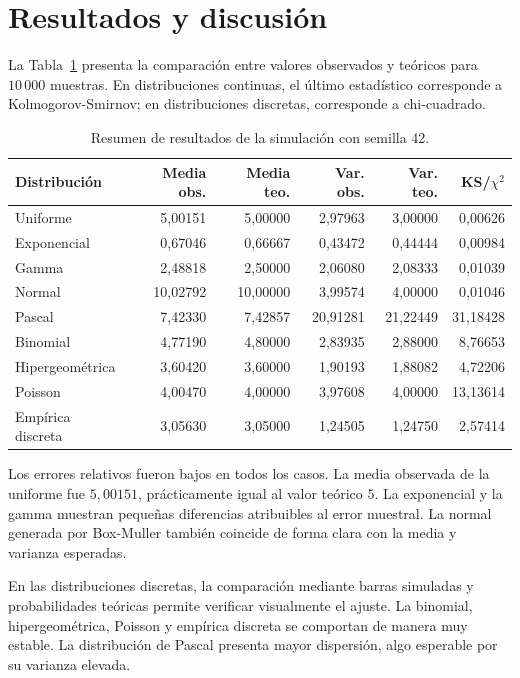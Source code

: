 \documentclass{article}
\begin{document}
\section{Resultados y discusión}

La Tabla~\ref{tab:resultados} presenta la comparación entre valores observados
y teóricos para $10\,000$ muestras. En distribuciones continuas, el último
estadístico corresponde a Kolmogorov-Smirnov; en distribuciones discretas,
corresponde a chi-cuadrado.

\begin{table}[H]
\centering
\caption{Resumen de resultados de la simulación con semilla 42.}
\label{tab:resultados}
\begin{tabular}{lrrrrr}
\toprule
\textbf{Distribución} & \textbf{Media obs.} & \textbf{Media teo.} &
\textbf{Var. obs.} & \textbf{Var. teo.} & \textbf{KS/$\chi^2$} \\
\midrule
Uniforme & 5{,}00151 & 5{,}00000 & 2{,}97963 & 3{,}00000 & 0{,}00626 \\
Exponencial & 0{,}67046 & 0{,}66667 & 0{,}43472 & 0{,}44444 & 0{,}00984 \\
Gamma & 2{,}48818 & 2{,}50000 & 2{,}06080 & 2{,}08333 & 0{,}01039 \\
Normal & 10{,}02792 & 10{,}00000 & 3{,}99574 & 4{,}00000 & 0{,}01046 \\
Pascal & 7{,}42330 & 7{,}42857 & 20{,}91281 & 21{,}22449 & 31{,}18428 \\
Binomial & 4{,}77190 & 4{,}80000 & 2{,}83935 & 2{,}88000 & 8{,}76653 \\
Hipergeométrica & 3{,}60420 & 3{,}60000 & 1{,}90193 & 1{,}88082 & 4{,}72206 \\
Poisson & 4{,}00470 & 4{,}00000 & 3{,}97608 & 4{,}00000 & 13{,}13614 \\
Empírica discreta & 3{,}05630 & 3{,}05000 & 1{,}24505 & 1{,}24750 & 2{,}57414 \\
\bottomrule
\end{tabular}
\end{table}

Los errores relativos fueron bajos en todos los casos. La media observada de la
uniforme fue $5{,}00151$, prácticamente igual al valor teórico $5$. La
exponencial y la gamma muestran pequeñas diferencias atribuibles al error
muestral. La normal generada por Box-Muller también coincide de forma clara con
la media y varianza esperadas.

En las distribuciones discretas, la comparación mediante barras simuladas y
probabilidades teóricas permite verificar visualmente el ajuste. La binomial,
hipergeométrica, Poisson y empírica discreta se comportan de manera muy estable.
La distribución de Pascal presenta mayor dispersión, algo esperable por su
varianza elevada.
\end{document}

